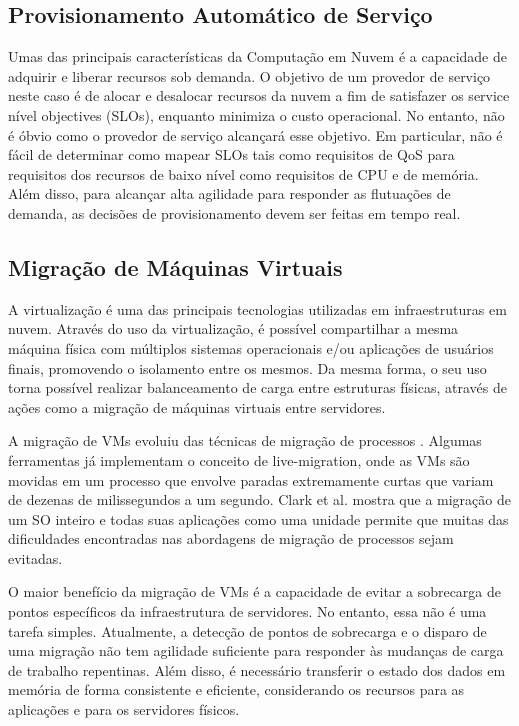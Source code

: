 	\subsection{Provisionamento Automático de Serviço}
	Umas das principais características da Computação em Nuvem é a capacidade de adquirir e liberar recursos sob demanda. O objetivo de um provedor de serviço neste caso é de alocar e desalocar recursos da nuvem a fim de satisfazer os service nível objectives (SLOs), enquanto minimiza o custo operacional.  No entanto, não é óbvio como o provedor de serviço alcançará esse objetivo. Em particular, não é fácil de determinar como mapear SLOs tais como requisitos de QoS para requisitos dos recursos de baixo nível como requisitos de CPU e de memória. Além disso, para alcançar alta agilidade para responder as flutuações de demanda, as decisões de provisionamento devem ser feitas em tempo real.
	
	\subsection{Migração de Máquinas Virtuais}
	A virtualização é uma das principais tecnologias utilizadas em infraestruturas em nuvem. Através do uso da virtualização, é possível compartilhar a mesma máquina física com múltiplos sistemas operacionais e/ou aplicações de usuários finais, promovendo o isolamento entre os mesmos. Da mesma forma, o seu uso torna possível realizar balanceamento de carga entre estruturas físicas, através de ações como a migração de máquinas virtuais entre servidores.
	
	A migração de VMs evoluiu das técnicas de migração de processos \cite{Osman:2002}. Algumas ferramentas já implementam o conceito de live-migration, onde as VMs são movidas em um processo que envolve paradas extremamente curtas que variam de dezenas de milissegundos a um segundo. Clark et al. \cite{Clark:2005} mostra que a migração de um SO inteiro e todas suas aplicações como uma unidade permite que muitas das dificuldades encontradas nas abordagens de migração de processos sejam evitadas.
	 
	O maior benefício da migração de VMs é a capacidade de evitar a
        sobrecarga de pontos específicos da infraestrutura de servidores. No
        entanto, essa não é uma tarefa simples. Atualmente, a detecção de pontos de sobrecarga e o disparo de uma migração não tem agilidade suficiente para responder às mudanças de carga de trabalho repentinas. Além disso, é necessário transferir o estado dos dados em memória de forma consistente e eficiente, considerando os recursos para as aplicações e para os servidores físicos.

